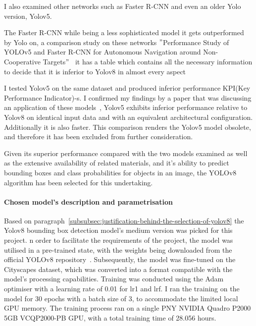 I also examined other networks such as Faster R-CNN and even an older Yolo version, Yolov5.

The Faster R-CNN while being a less sophisticated model it gets outperformed by Yolo on,
a comparison study on these networks \("\)Performance Study of YOLOv5 and Faster R-CNN for
Autonomous Navigation around Non-Cooperative Targets\("\)~\cite{E9843537} it has a table which contains all the necessary information to decide that it is inferior to Yolov8 in almost every aspect


I tested Yolov5 on the same dataset and produced inferior performance KPI(Key Performance Indicator)-s.
I confirmed my findings by a paper that was discussing an application of these models~\cite{Chitraningrum_Banowati_Herdiana_Mulyati_Sakti_Fudholi_Saputra_Farishi_Muchtar_Andria_2024},
Yolov5 exhibits inferior performance relative to Yolov8 on identical input data and with an equivalent architectural configuration.
Additionally it is also faster.
This comparison renders the Yolov5 model obsolete, and therefore it has been excluded from further consideration.

Given its superior performance compared with the two models examined
as well as the extensive availability of related materials, and it's ability to predict bounding boxes and class
probabilities for objects in an image, the YOLOv8 algorithm has been selected for this undertaking.

\paragraph{Chosen model's description and parametrisation}\label{par:model-architecture}

Based on paragraph~\ref{subsubsec:justification-behind-the-selection-of-yolov8} the Yolov8 bounding box
detection model's medium version was picked for this project.
n order to facilitate the requirements of the project, the model was utilised in a pre-trained state,
with the weights being downloaded from the official YOLOv8 repository~\cite{githubGitHubUltralyticsultralytics}.
Subsequently, the model was fine-tuned on the Cityscapes dataset, which was converted into a format compatible
with the model's processing capabilities.
Training was conducted using the Adam optimiser with a learning rate of 0.01 for lr1 and lrf.
I ran the training on the model for 30 epochs with a batch size of 3, to accommodate the limited local GPU memory.
The training process ran on a single PNY NVIDIA Quadro P2000 5GB VCQP2000-PB GPU, with a total training time of 28.056 hours.


